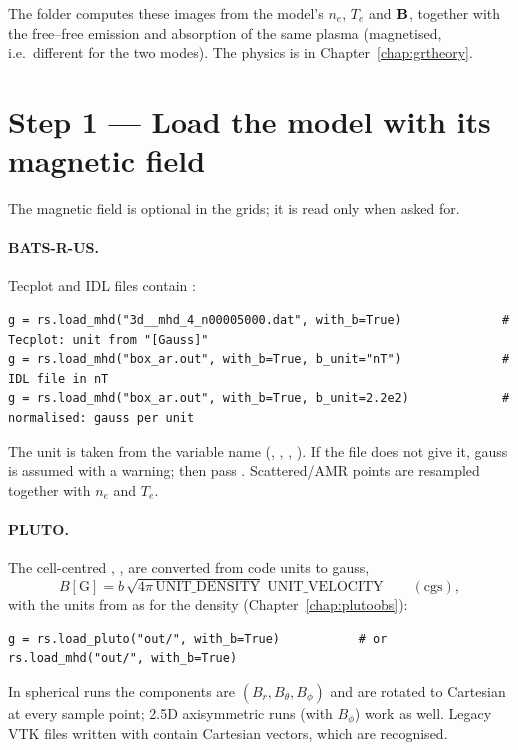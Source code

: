 The  folder computes these images from the model's $n_e$, $T_e$ and
$\mathbf{B}$, together with the free--free emission and absorption of the same plasma
(magnetised, i.e.\ different for the two modes). The physics is in
Chapter~\ref{chap:grtheory}.

\section{Step 1 --- Load the model with its magnetic field}

The magnetic field is optional in the grids; it is read only when asked for.

\paragraph{BATS-R-US.} Tecplot and IDL files contain :
\begin{lstlisting}[style=pyex]
g = rs.load_mhd("3d__mhd_4_n00005000.dat", with_b=True)              # Tecplot: unit from "[Gauss]"
g = rs.load_mhd("box_ar.out", with_b=True, b_unit="nT")              # IDL file in nT
g = rs.load_mhd("box_ar.out", with_b=True, b_unit=2.2e2)             # normalised: gauss per unit
\end{lstlisting}
The unit is taken from the variable name (\code{[Gauss]}, \code{[G]}, \code{[nT]},
\code{[T]}). If the file does not give it, gauss is assumed with a warning; then pass
. Scattered/AMR points are resampled together with $n_e$ and $T_e$.

\paragraph{PLUTO.} The cell-centred , ,  are converted
from code units to gauss,
\begin{equation}
  B[\text{G}] = b\,\sqrt{4\pi\,\text{UNIT\_DENSITY}}\;\text{UNIT\_VELOCITY}\qquad(\text{cgs}),
\end{equation}
with the units from  as for the density (Chapter~\ref{chap:plutoobs}):
\begin{lstlisting}[style=pyex]
g = rs.load_pluto("out/", with_b=True)           # or rs.load_mhd("out/", with_b=True)
\end{lstlisting}
In spherical runs the components are $(B_r,B_\theta,B_\phi)$ and are rotated to
Cartesian at every sample point; 2.5D axisymmetric runs (with $B_\phi$) work as well.
Legacy VTK files written with  contain Cartesian vectors, which
are recognised.

